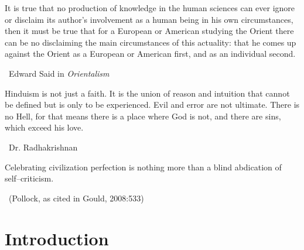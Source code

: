 \begin{myquote}
It is true that no production of knowledge in the human sciences can ever ignore or disclaim its author’s involvement as a human being in his own circumstances, then it must be true that for a European or American studying the Orient there can be no disclaiming the main circumstances of this actuality: that he comes up against the Orient as a European or American first, and as an individual second. 

~\hfill Edward Said in \textit{Orientalism}
\end{myquote}

\begin{myquote}
Hinduism is not just a faith. It is the union of reason and intuition that cannot be defined but is only to be experienced. Evil and error are not ultimate. There is no Hell, for that means there is a place where God is not, and there are sins, which exceed his love. 

~\hfill Dr. Radhakrishnan
\end{myquote}

\begin{myquote}
Celebrating civilization perfection is nothing more than a blind abdication of self–criticism. 

~\hfill (Pollock, as cited in Gould, 2008:533)
\end{myquote}


\section*{Introduction}

